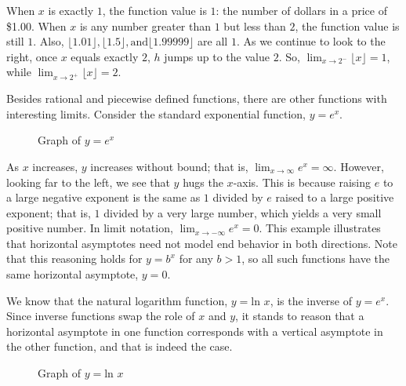 When $x$ is exactly $1$, the function value is $1$: the number of dollars in a 
price of \$1.00. When $x$ is any number greater than $1$ but less than $2$, the 
function value is still $1$. Also, $ \lfloor 1.01 \rfloor, \lfloor 1.5 \rfloor, 
\text{and} \lfloor 1.99999 \rfloor$ are all $1$. As we continue to look to the 
right, once $x$ equals exactly $2$, $h$ jumps up to the value $2$. So, 
$ \lim_{x \rightarrow 2^-} \lfloor x \rfloor = 1 $, while 
$ \lim_{x \rightarrow 2^+} \lfloor x \rfloor = 2 $.

Besides rational and piecewise defined functions, there are other functions with 
interesting limits. Consider the standard exponential function, $y = e^x$.

\begin{figure}[htbp]
  \centering
  \caption{Graph of \( y = e^x \)}
\end{figure}	

As $x$ increases, $y$ increases without bound; that is, $\lim_{x \rightarrow 
\infty} e^x = \infty$. However, looking far to the left, we see that $y$ hugs the 
$x$-axis. This is because raising $e$ to a large negative exponent is the same as 
$1$ divided by $e$ raised to a large positive exponent; that is, $1$ divided by a 
very large number, which yields a very small positive number. In limit notation, 
$\lim_{x \rightarrow -\infty} e^x = 0$. This example illustrates that horizontal 
asymptotes need not model end behavior in both directions. Note that this reasoning 
holds for $y = b^x$ for any $b > 1$, so all such functions have the same horizontal 
asymptote, $y = 0$.

We know that the natural logarithm function, $y = \text{ln } x$, is the inverse of 
$y = e^x$. Since inverse functions swap the role of $x$ and $y$, it stands to 
reason that a horizontal asymptote in one function corresponds with a vertical 
asymptote in the other function, and that is indeed the case.

\begin{figure}[htbp]
  \centering
  \caption{Graph of \( y = \text{ln } x \)}
\end{figure}	

